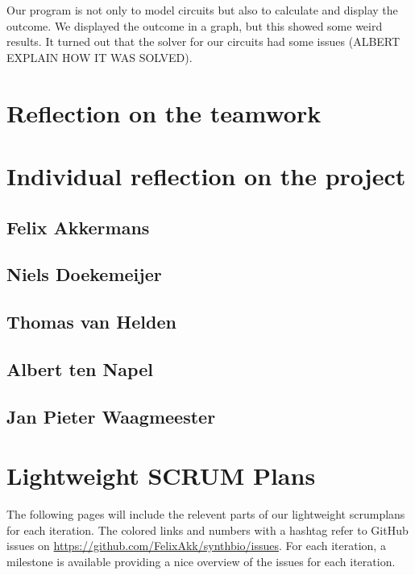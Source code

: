 \documentclass[a4paper]{article}
\begin{document}
Our program is not only to model circuits but also to calculate and display the outcome. We displayed the outcome in a graph, but this showed some weird results. It turned out that the solver for our circuits had some issues (ALBERT EXPLAIN HOW IT WAS SOLVED).

\section{Reflection on the teamwork}

\section{Individual reflection on the project} %
\subsection{Felix Akkermans}
\subsection{Niels Doekemeijer}
\subsection{Thomas van Helden}
\subsection{Albert ten Napel}
\subsection{Jan Pieter Waagmeester}


\section{Lightweight SCRUM Plans}
The following pages will include the relevent parts of our lightweight scrumplans for each iteration. The colored links and numbers with a hashtag refer to GitHub issues on \url{https://github.com/FelixAkk/synthbio/issues}. For each iteration, a milestone is available providing a nice overview of the issues for each iteration.










\end{document}
